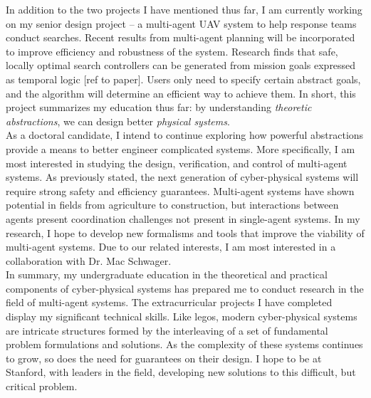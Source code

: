 \documentclass[]{article}
\begin{document}
In addition to the two projects I have mentioned thus far, I am currently working on my senior design project -- a multi-agent UAV system to help response teams conduct searches. Recent results from multi-agent planning will be incorporated to improve efficiency and robustness of the system. Research finds that safe, locally optimal search controllers can be generated from mission goals expressed as temporal logic [ref to paper]. Users only need to specify certain abstract goals, and the algorithm will determine an efficient way to achieve them. In short, this project summarizes my education thus far: by understanding \emph{theoretic abstractions}, we can design better \emph{physical systems}.\\

As a doctoral candidate, I intend to continue exploring how powerful abstractions provide a means to better engineer complicated systems. More specifically, I am most interested in studying the design, verification, and control of multi-agent systems. As previously stated, the next generation of cyber-physical systems will require strong safety and efficiency guarantees. Multi-agent systems have shown potential in fields from agriculture to construction, but interactions between agents present coordination challenges not present in single-agent systems. In my research, I hope to develop new formalisms and tools that improve the viability of multi-agent systems. Due to our related interests, I am most interested in a collaboration with Dr. Mac Schwager.\\

In summary, my undergraduate education in the theoretical and practical components of cyber-physical systems has prepared me to conduct research in the field of multi-agent systems. The extracurricular projects I have completed display my significant technical skills. Like legos, modern cyber-physical systems are intricate structures formed by the interleaving of a set of fundamental problem formulations and solutions. As the complexity of these systems continues to grow, so does the need for guarantees on their design. I hope to be at Stanford, with leaders in the field, developing new solutions to this difficult, but critical problem. 
\pagebreak
\end{document}
